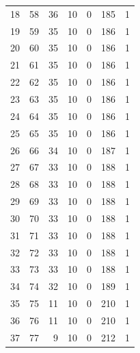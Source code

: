 \documentclass[a4paper,twoside,12pt]{book}
\begin{document}
\begin{appendices}
\begin{table}
\begin{tabular}{lrrrrrr}
		18  &     58 &        36 &        10 &               0 &             185 &         1 \\
		19  &     59 &        35 &        10 &               0 &             186 &         1 \\
		20  &     60 &        35 &        10 &               0 &             186 &         1 \\
		21  &     61 &        35 &        10 &               0 &             186 &         1 \\
		22  &     62 &        35 &        10 &               0 &             186 &         1 \\
		23  &     63 &        35 &        10 &               0 &             186 &         1 \\
		24  &     64 &        35 &        10 &               0 &             186 &         1 \\
		25  &     65 &        35 &        10 &               0 &             186 &         1 \\
		26  &     66 &        34 &        10 &               0 &             187 &         1 \\
		27  &     67 &        33 &        10 &               0 &             188 &         1 \\
		28  &     68 &        33 &        10 &               0 &             188 &         1 \\
		29  &     69 &        33 &        10 &               0 &             188 &         1 \\
		30  &     70 &        33 &        10 &               0 &             188 &         1 \\
		31  &     71 &        33 &        10 &               0 &             188 &         1 \\
		32  &     72 &        33 &        10 &               0 &             188 &         1 \\
		33  &     73 &        33 &        10 &               0 &             188 &         1 \\
		34  &     74 &        32 &        10 &               0 &             189 &         1 \\
		35  &     75 &        11 &        10 &               0 &             210 &         1 \\
		36  &     76 &        11 &        10 &               0 &             210 &         1 \\
		37  &     77 &         9 &        10 &               0 &             212 &         1 \\

\end{tabular}
\end{table}
\end{appendices}
\end{document}
